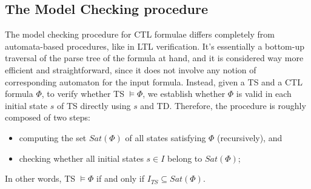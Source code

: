 \documentclass{article}
\begin{document}
\subsection{The Model Checking procedure}
\label{subsec:mc}
The model checking procedure for CTL formulae differs completely from automata-based procedures, like in LTL verification. It's essentially a bottom-up traversal of the parse tree of the formula at hand, and it is considered way more efficient and straightforward, since it does not involve any notion of corresponding automaton for the input formula. Instead, given a TS and a CTL formula $\Phi$, to verify whether TS $\vDash \Phi$, we establish whether $\Phi$ is valid in each initial state $s$ of TS directly using $s$ and TD. 
Therefore, the procedure is roughly composed of two steps: 
\begin{itemize}
    \item computing the set $Sat(\Phi)$ of all states satisfying $\Phi$ (recursively), and
    \item checking whether all initial states $s \in I$ belong to $Sat(\Phi)$; 
\end{itemize}
In other words, TS $\vDash \Phi$ if and only if $I_{TS} \subseteq Sat(\Phi)$.
\end{document}

